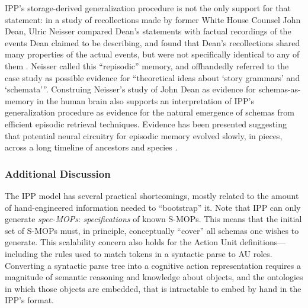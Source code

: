 IPP's storage-derived generalization procedure is not the only support for that statement: in a study of recollections made by former White House Counsel John Dean, Ulric Neisser compared Dean's statements with factual recordings of the events Dean claimed to be describing, and found that Dean's recollections shared many properties of the actual events, but were not specifically identical to any of them \citep{repisodic}. Neisser called this ``repisodic'' memory, and offhandedly referred to the case study as possible evidence for ``theoretical ideas about `story grammars' and `schemata'{}''. Construing Neisser's study of John Dean as evidence for schemas-as-memory in the human brain also supports an interpretation of IPP's generalization procedure as evidence for the natural emergence of schemas from efficient episodic retrieval techniques. Evidence has been presented suggesting that potential neural circuitry for episodic memory evolved slowly, in pieces, across a long timeline of ancestors and species \citep{allen2013evolution}.

\subsubsection{Additional Discussion}
The IPP model has several practical shortcomings, mostly related to the amount of hand-engineered information needed to ``bootstrap'' it. Note that IPP can only generate \textit{spec-MOPs}: \textit{specifications} of known S-MOPs. This means that the initial set of S-MOPs must, in principle, conceptually ``cover'' all schemas one wishes to generate. This scalability concern also holds for the Action Unit definitions---including the rules used to match tokens in a syntactic parse to AU roles. Converting a syntactic parse tree into a cognitive action representation requires a magnitude of semantic reasoning and knowledge about objects, and the ontologies in which those objects are embedded, that is intractable to embed by hand in the IPP's format.

